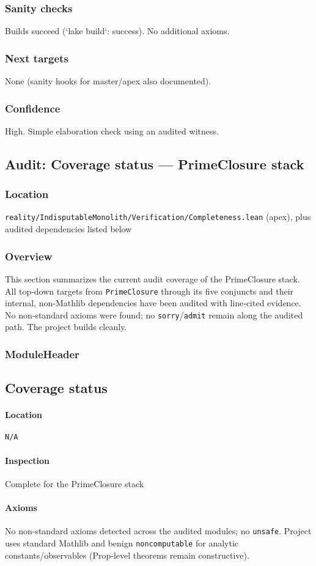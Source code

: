 \documentclass{article}
\newcommand{\FileRef}[1]{\texttt{#1}}
\newcommand{\ModuleHeader}[3]{%
  \subsection{#1}
  \paragraph{Location} \FileRef{#2}\\
  \paragraph{Inspection} #3
}
\begin{document}
\subsubsection{Sanity checks}
Builds succeed (`lake build`: success). No additional axioms.

\subsubsection{Next targets}
None (sanity hooks for master/apex also documented).

\subsubsection{Confidence}
High. Simple elaboration check using an audited witness.

\subsection{Audit: Coverage status — PrimeClosure stack}
\subsubsection{Location}
\FileRef{reality/IndisputableMonolith/Verification/Completeness.lean} (apex), plus audited dependencies listed below

\subsubsection{Overview}
This section summarizes the current audit coverage of the PrimeClosure stack. All top‑down targets from \texttt{PrimeClosure} through its five conjuncts and their internal, non‑Mathlib dependencies have been audited with line‑cited evidence. No non‑standard axioms were found; no \texttt{sorry}/\texttt{admit} remain along the audited path. The project builds cleanly.

\subsubsection{ModuleHeader}
\ModuleHeader{Coverage status}{N/A}{Complete for the PrimeClosure stack}

\paragraph{Axioms}
No non‑standard axioms detected across the audited modules; no \texttt{unsafe}. Project uses standard Mathlib and benign \texttt{noncomputable} for analytic constants/observables (Prop‑level theorems remain constructive).
\end{document}
